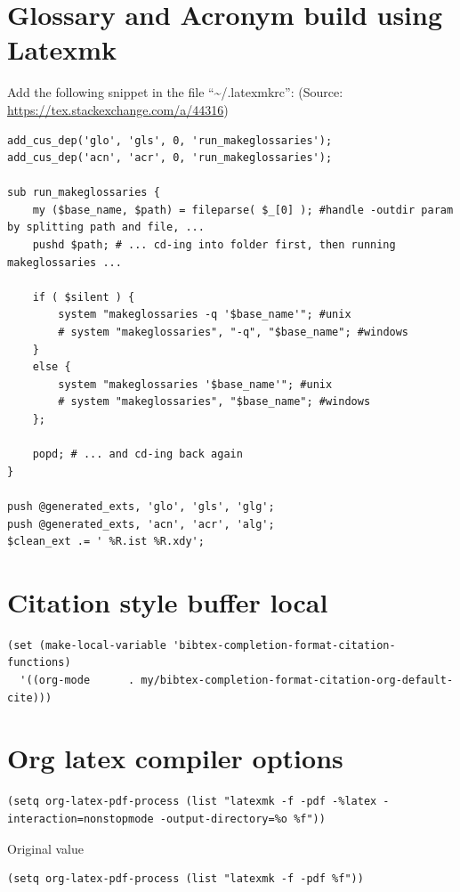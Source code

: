 \documentclass[letterpaper, 12pt]{report}
\begin{document}
\section{Glossary and Acronym build using Latexmk}
\label{sec:org94133e2}

Add the following snippet in the file ``\textasciitilde{}/.latexmkrc'': (Source: \url{https://tex.stackexchange.com/a/44316})

\begin{verbatim}
add_cus_dep('glo', 'gls', 0, 'run_makeglossaries');
add_cus_dep('acn', 'acr', 0, 'run_makeglossaries');

sub run_makeglossaries {
    my ($base_name, $path) = fileparse( $_[0] ); #handle -outdir param by splitting path and file, ...
    pushd $path; # ... cd-ing into folder first, then running makeglossaries ...

    if ( $silent ) {
        system "makeglossaries -q '$base_name'"; #unix
        # system "makeglossaries", "-q", "$base_name"; #windows
    }
    else {
        system "makeglossaries '$base_name'"; #unix
        # system "makeglossaries", "$base_name"; #windows
    };

    popd; # ... and cd-ing back again
}

push @generated_exts, 'glo', 'gls', 'glg';
push @generated_exts, 'acn', 'acr', 'alg';
$clean_ext .= ' %R.ist %R.xdy';
\end{verbatim}
\section{Citation style buffer local}
\label{sec:org97a37f4}

\begin{verbatim}
(set (make-local-variable 'bibtex-completion-format-citation-functions)
  '((org-mode      . my/bibtex-completion-format-citation-org-default-cite)))
\end{verbatim}
\section{Org latex compiler options}
\label{sec:orgc7e24c0}

\begin{verbatim}
(setq org-latex-pdf-process (list "latexmk -f -pdf -%latex -interaction=nonstopmode -output-directory=%o %f"))
\end{verbatim}

Original value

\begin{verbatim}
(setq org-latex-pdf-process (list "latexmk -f -pdf %f"))
\end{verbatim}
\end{document}
